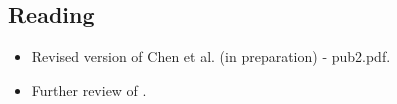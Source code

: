 \subsection{Reading}
\begin{itemize}
    \item Revised version of Chen et al. (in preparation) - pub2.pdf.
    \item Further review of \citet{2018MNRAS.480.2217S}.
\end{itemize}
